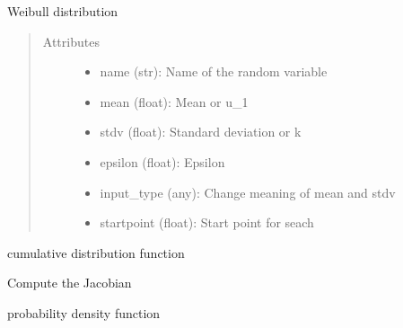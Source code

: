 \documentclass[letterpaper,10pt,english]{sphinxmanual}
\begin{document}
\begin{fulllineitems}
Weibull distribution
\begin{quote}\begin{description}
\item[{Attributes }] \leavevmode\begin{itemize}
\item {} 
name (str):   Name of the random variable

\item {} 
mean (float): Mean or u\_1

\item {} 
stdv (float): Standard deviation or k

\item {} 
epsilon (float): Epsilon

\item {} 
input\_type (any): Change meaning of mean and stdv

\item {} 
startpoint (float): Start point for seach

\end{itemize}

\end{description}\end{quote}


\begin{fulllineitems}
cumulative distribution function

\end{fulllineitems}



\begin{fulllineitems}
Compute the Jacobian

\end{fulllineitems}



\begin{fulllineitems}
probability density function


\end{fulllineitems}
\end{fulllineitems}
\end{document}

